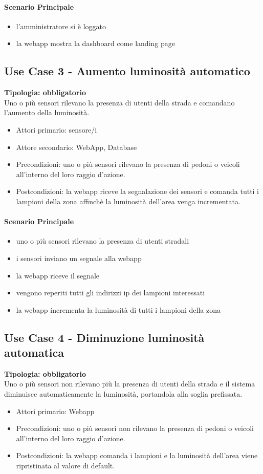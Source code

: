 \documentclass[12pt]{article}
\begin{document}
\paragraph{Scenario Principale}
\begin{itemize}
	\item l'amministratore si è loggato
	\item la webapp mostra la dashboard come landing page
\end{itemize}

\subsection{Use Case 3 - Aumento luminosità automatico}
\textbf{Tipologia: obbligatorio}\\
Uno o più sensori rilevano la presenza di utenti della strada e comandano l'aumento della luminosità.
\begin{itemize}
	\item Attori primario: sensore/i
	\item Attore secondario: WebApp, Database
	\item Precondizioni: uno o più sensori rilevano la presenza di pedoni o veicoli all'interno del loro raggio d'azione.
	\item Postcondizioni: la webapp riceve la segnalazione dei sensori e comanda tutti i lampioni della zona affinchè la luminosità dell'area venga incrementata.
\end{itemize}
\paragraph{Scenario Principale}
\begin{itemize}
	\item uno o più sensori rilevano la presenza di utenti stradali
	\item i sensori inviano un segnale alla webapp
	\item la webapp riceve il segnale
	\item vengono reperiti tutti gli indirizzi ip dei lampioni interessati
	\item la webapp incrementa la luminosità di tutti i lampioni della zona
\end{itemize}

\subsection{Use Case 4 - Diminuzione luminosità automatica}
\textbf{Tipologia: obbligatorio}\\
Uno o più sensori non rilevano più la presenza di utenti della strada e il sistema diminuisce automaticamente la luminosità, portandola alla soglia prefissata.
\begin{itemize}
	\item Attori primario: Webapp
	\item Precondizioni: uno o più sensori non rilevano la presenza di pedoni o veicoli all'interno del loro raggio d'azione.
	\item Postcondizioni: la webapp comanda i lampioni e la luminosità dell'area viene ripristinata al valore di default.
\end{itemize}
\end{document}
